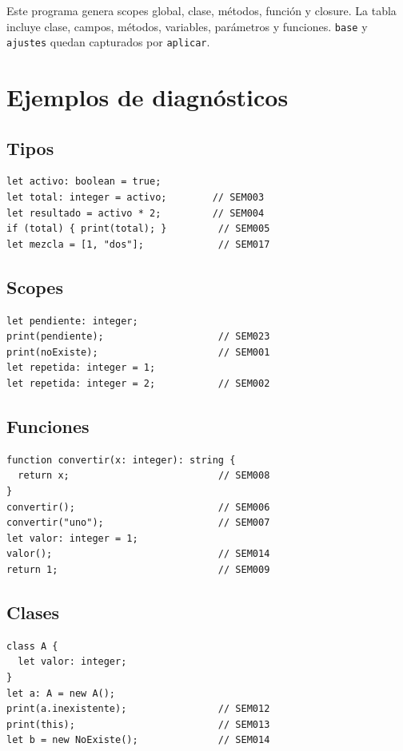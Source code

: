 \documentclass[11pt,letterpaper,oneside]{report}
\newcommand{\codigo}[1]{\texttt{#1}}
\begin{document}
Este programa genera scopes global, clase, métodos, función y closure. La tabla
incluye clase, campos, métodos, variables, parámetros y funciones. \codigo{base} y
\codigo{ajustes} quedan capturados por \codigo{aplicar}.

\chapter{Ejemplos de diagnósticos}

\section{Tipos}

\begin{verbatim}
let activo: boolean = true;
let total: integer = activo;        // SEM003
let resultado = activo * 2;         // SEM004
if (total) { print(total); }         // SEM005
let mezcla = [1, "dos"];             // SEM017
\end{verbatim}

\section{Scopes}

\begin{verbatim}
let pendiente: integer;
print(pendiente);                    // SEM023
print(noExiste);                     // SEM001
let repetida: integer = 1;
let repetida: integer = 2;           // SEM002
\end{verbatim}

\section{Funciones}

\begin{verbatim}
function convertir(x: integer): string {
  return x;                          // SEM008
}
convertir();                         // SEM006
convertir("uno");                    // SEM007
let valor: integer = 1;
valor();                             // SEM014
return 1;                            // SEM009
\end{verbatim}

\section{Clases}

\begin{verbatim}
class A {
  let valor: integer;
}
let a: A = new A();
print(a.inexistente);                // SEM012
print(this);                         // SEM013
let b = new NoExiste();              // SEM014
\end{verbatim}
\end{document}
